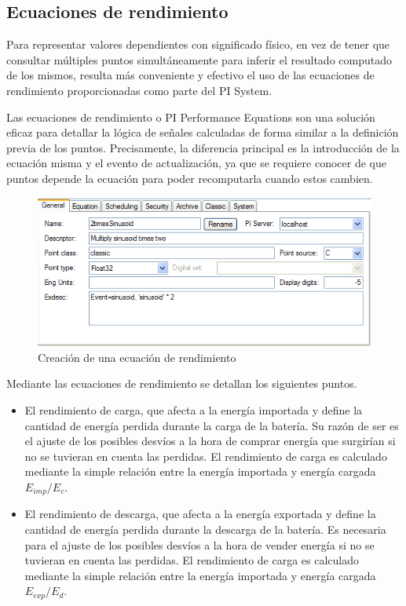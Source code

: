 \subsection{Ecuaciones de rendimiento}
\label{makereference3.5.1}

Para representar valores dependientes con significado físico, en vez de tener que consultar múltiples puntos simultáneamente para inferir el resultado computado de los mismos, resulta más conveniente y efectivo el uso de las ecuaciones de rendimiento proporcionadas como parte del PI System.

Las ecuaciones de rendimiento o PI Performance Equations son una solución eficaz para detallar la lógica de señales calculadas de forma similar a la definición previa de los puntos. Precisamente, la diferencia principal es la introducción de la ecuación misma y el evento de actualización, ya que se requiere conocer de que puntos depende la ecuación para poder recomputarla cuando estos cambien.

\begin{figure}
  \centering
  \includegraphics[width=0.5\linewidth]{figures/ecuaciones-de-rendimiento.png}
  \caption{Creación de una ecuación de rendimiento}
  \label{fig:ecuaciones-de-rendimiento}
\end{figure}

Mediante las ecuaciones de rendimiento se detallan los siguientes puntos.

\begin{itemize}

  \item El rendimiento de carga, que afecta a la energía importada y define la cantidad de energía perdida durante la carga de la batería. Su razón de ser es el ajuste de los posibles desvíos a la hora de comprar energía que surgirían si no se tuvieran en cuenta las perdidas. El rendimiento de carga es calculado mediante la simple relación entre la energía importada y energía cargada \( E_{imp} / E_c \).

  \item El rendimiento de descarga, que afecta a la energía exportada y define la cantidad de energía perdida durante la descarga de la batería. Es necesaria para el ajuste de los posibles desvíos a la hora de vender energía si no se tuvieran en cuenta las perdidas. El rendimiento de carga es calculado mediante la simple relación entre la energía importada y energía cargada \( E_{exp} / E_d \).

\end{itemize}

